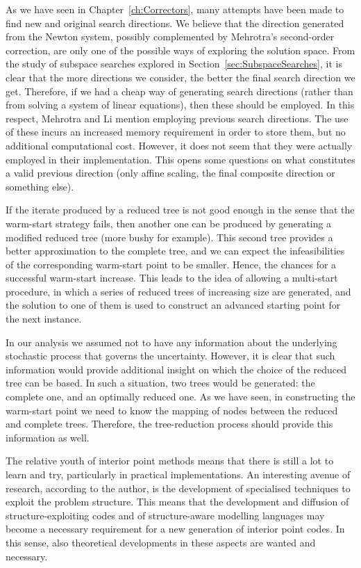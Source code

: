As we have seen in Chapter~\ref{ch:Correctors}, many attempts
have been made to find new and original search directions.
We believe that the direction generated from the Newton system,
possibly complemented by Mehrotra's second-order correction,
are only one of the possible ways of exploring the solution space.
From the study of subspace searches explored in
Section~\ref{sec:SubspaceSearches}, it is clear that the more 
directions we consider, the better the final search direction 
we get. Therefore, if we had a cheap way of generating search
directions (rather than from solving a system of linear equations),
then these should be employed.
In this respect, Mehrotra and Li \cite{MehrotraLi} 
mention employing previous search directions.
The use of these incurs an increased memory requirement
in order to store them, but no additional computational cost.
However, it does not seem that they were actually employed in
their implementation.
This opens some questions on what constitutes a valid
previous direction (only affine scaling, the final composite direction
or something else).

If the iterate produced by a reduced tree is not good enough 
in the sense that the warm-start strategy fails, then another one 
can be produced by generating a modified reduced tree (more 
bushy for example).
This second tree provides a better approximation to the
complete tree, and we can expect the infeasibilities of the 
corresponding warm-start point to be smaller.
Hence, the chances for a successful 
warm-start increase.
This leads to the idea of allowing a multi-start procedure, in
which a series of reduced trees of increasing size are generated,
and the solution to one of them is used to construct an 
advanced starting point for the next instance.

In our analysis we assumed not to have any information about the
underlying stochastic process that governs the uncertainty.
However, it is clear that such information would provide additional
insight on which the choice of the reduced tree can be based.
In such a situation, two trees would be generated: the complete one,
and an optimally reduced one.
As we have seen, in constructing the warm-start point we need
to know the mapping of nodes between the reduced and complete trees.
Therefore, the tree-reduction process should provide this information
as well.

The relative youth of interior point methods means that there is still
a lot to learn and try, particularly in practical implementations.
An interesting avenue of research, according to the author, is the development
of specialised techniques to exploit the problem structure.
This means that the development and diffusion of structure-exploiting
codes and of structure-aware modelling languages may become a necessary
requirement for a new generation of interior point codes.
In this sense, also theoretical developments in these aspects are 
wanted and necessary.
